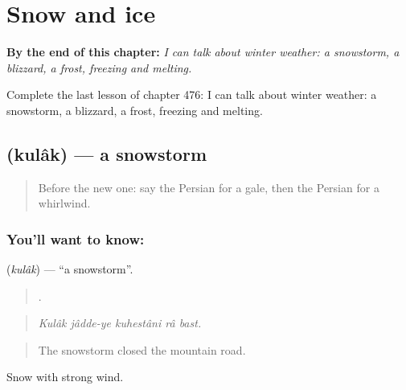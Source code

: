 
\chapter{Snow and ice}
\label{ch:fa-snow-and-ice}

\begin{chapteropening}
\textbf{By the end of this chapter:} \emph{I can talk about winter weather: a snowstorm, a blizzard, a frost, freezing and melting.}

Complete the last lesson of chapter 476: I can talk about winter weather: a snowstorm, a blizzard, a frost, freezing and melting.
\end{chapteropening}

\section[\texorpdfstring{\fa{کولاک} (kulâk)}{کولاک (kulâk)}]{ (kulâk) — a snowstorm}

\label{lesson:FA-C476-kulak}



\begin{quote}
Before the new one: say the Persian for a gale, then the Persian for a whirlwind.
\end{quote}

\subsection*{You'll want to know: }
\textbf{} (\emph{kulâk}) — \textquotedblleft{}a snowstorm\textquotedblright{}.

\begin{quote}
    .
\end{quote}

\begin{quote}
\emph{Kulâk jâdde-ye kuhestâni râ bast.}
\end{quote}

\begin{quote}
The snowstorm closed the mountain road.
\end{quote}

Snow with strong wind.


